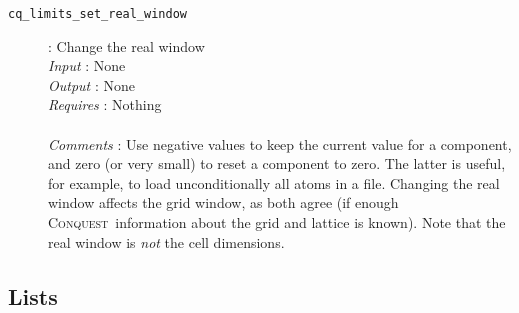 \documentclass[a4paper,notitlepage,11pt]{article}
\def\CQ{\textsc{Conquest}}
\begin{document}
\begin{description}
\item[\texttt{cq\_limits\_set\_real\_window}]: Change the real window\\
  \emph{Input} : None\\
  \emph{Output} : None\\
  \emph{Requires} : Nothing\\
  \\
  \emph{Comments} : Use negative values to keep the current value for a
  component, and zero (or very small) to reset a component to zero. The latter
  is useful, for example, to load unconditionally all atoms in a file. Changing
  the real window affects the grid window, as both agree (if enough \CQ\
  information about the grid and lattice is known). Note that the real window is
  \emph{not} the cell dimensions.
\end{description}

\pagebreak

\subsection{Lists}
\label{sec:py-lists}
\end{document}
